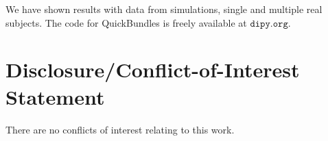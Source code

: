 \documentclass{bioinfo}
\begin{document}
We have shown results with data from simulations, single and multiple
real subjects. The code for QuickBundles is freely available at
$\texttt{dipy.org}$.

\section*{Disclosure/Conflict-of-Interest Statement}
There are no conflicts of interest relating to this work.

%

%
%
%
%

\end{document}
